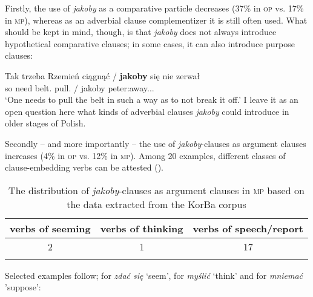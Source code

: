 \documentclass[output=paper]{langsci/langscibook}
\begin{document}
Firstly, the use of \emph{jakoby} as a comparative particle decreases (37\% in \textsc{op} vs. 17\% in \textsc{mp}), whereas as an adverbial clause complementizer it is still often used. What should be kept in mind, though, is that \emph{jakoby} does not always introduce hypothetical comparative clauses; in some cases, it can also introduce purpose clauses:

\ea \gll Tak trzeba Rzemień ciągnąć {\normalfont/} \textbf{jakoby} się nie zerwał \\
		so need belt.{\acc} pull.{\infv} / jakoby {} {\negation} peter:away.{\lptcp}.{\sg}.{\masc} \\
\glt	`One needs to pull the belt in such a way as to not break it off.' 
\z
I leave it as an open question here what kinds of adverbial clauses \emph{jakoby} could introduce in older stages of Polish.

Secondly – and more importantly – the use of \emph{jakoby}-clauses as argument clauses increases (4\% in \textsc{op} vs. 12\% in \textsc{mp}). Among 20 examples, different classes of clause-embedding verbs can be attested ().

 \begin{table}[h]  \begin{tabular}{ccc}
\lsptoprule
verbs of seeming & verbs of thinking & verbs of speech\slash report \\
\midrule
2 & 1 & 17  \\
 \lspbottomrule
\end{tabular}
\caption{The distribution of \emph{jakoby}-clauses as argument clauses in \textsc{mp} based on the data extracted from the KorBa corpus\label{tab:jakoby:6}}
\end{table}

\noindent Selected examples follow;  for \emph{zdać się} `seem',  for \emph{myślić} `think' and  for \emph{mniemać} 'suppose':\largerpage
\end{document}
